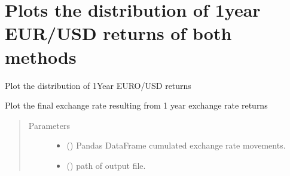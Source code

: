 \documentclass[a4paper,11pt,english]{sphinxmanual}
\begin{document}
\section{Plots the distribution of 1\sphinxhyphen{}year EUR/USD returns of both methods}
\label{\detokenize{simulation:plots-the-distribution-of-1-year-eur-usd-returns-of-both-methods}}\label{\detokenize{simulation:module-src.simulation.task_exchange_rate_change}}
\sphinxAtStartPar
Plot the distribution of 1\sphinxhyphen{}Year EURO/USD returns

\begin{fulllineitems}
\label{\detokenize{simulation:src.simulation.task_exchange_rate_change.plot_total_change}}
\sphinxAtStartPar
Plot the final exchange rate resulting from 1 year exchange rate
returns
\begin{quote}\begin{description}
\item[{Parameters}] \leavevmode\begin{itemize}
\item {} 
\sphinxAtStartPar
{} () \textendash{} Pandas DataFrame cumulated exchange rate movements.

\item {} 
\sphinxAtStartPar
{} () \textendash{} path of output file.

\end{itemize}

\end{description}\end{quote}

\end{fulllineitems}

\label{\detokenize{contract_specs:contract-specs}}
\end{document}
